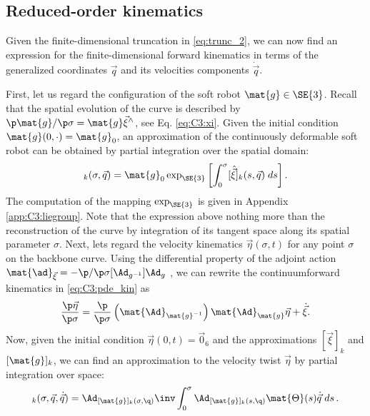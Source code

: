 
\subsection{Reduced-order kinematics}
Given the finite-dimensional truncation in \eqref{eq:trunc_2}, we can now find an expression for the finite-dimensional forward kinematics in terms of the generalized coordinates $\vec{q}$ and its velocities components $\dot{\vec{q}}$.

First, let us regard the configuration of the soft robot $\mat{g} \in \SE{3}$. Recall that the spatial evolution of the curve is described by $\p \mat{g}/\p\sigma = \mat{g} \vec{\xi}^\wedge$, see Eq. \eqref{eq:C3:xi}. Given the initial condition $\mat{g}(0,\cdot) = \mat{g}_0$, an approximation of the continuously deformable soft robot can be obtained by partial integration over the spatial domain:
%
\vspace{-2mm}
\begin{equation}
[\mat{g}]_k(\sigma,\vec{q}) = \mat{g}_0 \exp_{\SE{3}}\left[\int_0^\sigma [\hat{\vec{\xi}}]_k(s,\vec{q}) \; ds \right].
\end{equation}
%
The computation of the mapping $\exp_{\SE{3}}$ is given in Appendix \ref{app:C3:liegroup}. Note that the expression above nothing more than the reconstruction of the curve by integration of its tangent space along its spatial parameter $\sigma$. Next, lets regard the velocity kinematics $\vec{\eta}(\sigma,t)$ for any point $\sigma$ on the backbone curve. Using the differential property of the adjoint action $\mat{\ad}_{\vec{\xi}} = -\p /\p \sigma [\Ad_{g^{-1}}] \Ad_{g}$ \cite{Murray1994}, we can rewrite the
continuumforward kinematics in \eqref{eq:C3:pde_kin} as
%
\begin{equation}
\frac{\p \vec{\eta}}{\p \sigma } = \frac{\p }{\p \sigma }\left(\mat{\Ad}_{\mat{g}^{-1}}\right) \mat{\Ad}_{\mat{g}} \vec{\eta} + \dot{\vec{\xi}}. \label{eq:eta_adg}
\end{equation}
%
Now, given the initial condition $\vec{\eta}(0,t) = \vec{0}_6$ and the approximations $[\vec{\xi}]_k$ and $[\mat{g}]_k$, we can find an approximation to the velocity twist $\vec{\eta}$ by partial integration over space:
%
\begin{equation}
[\vec{\eta}]_k(\sigma,\vec{q},\dot{\vec{q}}) = \Ad_{[\mat{g}]_k(\sigma,\q)}\inv \int_0^\sigma \Ad_{[\mat{g}]_k(s,\q)} \mat{\Theta}(s) \dot{\vec{q}} \; ds \,. \label{eq:C3:eta_analytic}
\end{equation}
